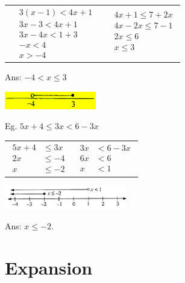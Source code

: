 \documentclass[twocolumn]{article}
\begin{document}
\bigskip 
\begin{tabular}{c|c} 
	$
	\begin{aligned}
		& 3(x-1)<4 x+1 \\
		& 3 x-3<4 x+1 \\
		& 3 x-4 x<1+3 \\
		& -x<4 \\
		& x>-4
	\end{aligned}
	$
	& 
	$
	\begin{aligned}
		& 4 x+1 \leq 7+2 x \\
		& 4 x-2 x \leq 7-1 \\
		& 2 x \leq 6 \\
		& x \leq 3 \\
		& ~
	\end{aligned}
	$
\end{tabular} 

\bigskip 

\noindent 
Ans: $-4 < x \leq 3$

\includegraphics[width=0.3\textwidth]{03.png}

\bigskip 

\noindent 
Eg. $5 x+4 \leq 3 x<6-3 x$

\bigskip 
\begin{tabular}{c|c} 
	$
	\begin{aligned}
		5 x+4 & \leq 3 x \\
		2 x & \leq-4\\
		x & \leq-2
	\end{aligned}
	$
	& 
	$
	\begin{aligned}
		3 x & <6-3 x \\
		6 x & <6 \\
		x & <1
	\end{aligned}
	$
\end{tabular} 

\bigskip 

\includegraphics[width=0.4\textwidth]{04.png}

\noindent 
Ans: $x \leq -2$.

\section*{Expansion}
\end{document}
